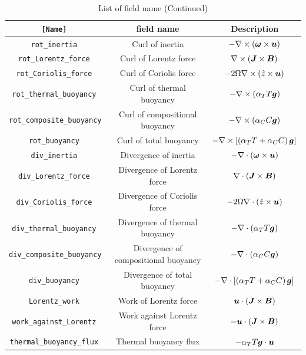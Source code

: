 \begin{table}[htp]
\caption{List of field name (Continued)}
\begin{center}
\begin{tabular}{|c|c|c|}
\hline
\tt [Name] & field name & Description \\ \hline \hline
\tt rot\_inertia & Curl of inertia &  $ -\nabla \times \left(\mbox{\boldmath$\omega$} \times \mbox{\boldmath$u$}\right) $ \\
\tt rot\_Lorentz\_force & Curl of Lorentz force &  $ \nabla \times \left(\mbox{\boldmath$J$} \times \mbox{\boldmath$B$}\right) $ \\
\tt rot\_Coriolis\_force & Curl of Coriolis force &  $ -2 \Omega \nabla \times \left(\hat{z} \times \mbox{\boldmath$u$} \right) $ \\
\tt rot\_thermal\_buoyancy &   Curl of thermal buoyancy &  $ - \nabla \times \left(\alpha_{T} T \mbox{\boldmath$g$}\right)  $ \\
\tt rot\_composite\_buoyancy & Curl of compositional buoyancy &  $ - \nabla \times \left(\alpha_{C} C\mbox{\boldmath$g$}\right)  $\\
\tt rot\_buoyancy & Curl of total buoyancy &  $ - \nabla \times \left[\left(\alpha_{T} T + \alpha_{C} C \right) \mbox{\boldmath$g$}\right]  $ \\
\hline
\tt div\_inertia & Divergence of inertia &  $ -\nabla \cdot \left(\mbox{\boldmath$\omega$} \times \mbox{\boldmath$u$}\right) $ \\
\tt div\_Lorentz\_force & Divergence of Lorentz force &  $ \nabla \cdot \left(\mbox{\boldmath$J$} \times \mbox{\boldmath$B$}\right) $ \\
\tt div\_Coriolis\_force & Divergence of Coriolis force &  $ -2 \Omega \nabla \cdot \left(\hat{z} \times \mbox{\boldmath$u$} \right) $ \\
\tt div\_thermal\_buoyancy & Divergence of thermal buoyancy &  $ - \nabla \cdot \left(\alpha_{T} T \mbox{\boldmath$g$}\right)  $ \\
\tt div\_composite\_buoyancy & Divergence of compositional buoyancy &  $ - \nabla \cdot \left(\alpha_{C} C \mbox{\boldmath$g$}\right)  $\\
\tt div\_buoyancy & Divergence of total buoyancy &  $ - \nabla \cdot \left[ \left(\alpha_{T} T + \alpha_{C} C \right) \mbox{\boldmath$g$}\right]  $ \\
\hline
\tt Lorentz\_work & Work of Lorentz force
 & $\mbox{\boldmath$u$}\cdot \left( \mbox{\boldmath$J$} \times \mbox{\boldmath$B$} \right) $ \\ 
\tt work\_against\_Lorentz & Work against Lorentz force
 & $- \mbox{\boldmath$u$}\cdot \left( \mbox{\boldmath$J$} \times \mbox{\boldmath$B$} \right) $ \\ 
\tt thermal\_buoyancy\_flux & Thermal buoyancy flux & $ -\alpha_{T} T \mbox{\boldmath$g$} \cdot \mbox{\boldmath$u$} $ \\

\end{tabular}
\end{center}
\end{table}

